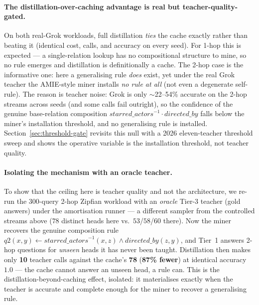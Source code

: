 \documentclass[11pt]{article}
\theoremstyle{plain}
\begin{document}
\paragraph{The distillation-over-caching advantage is real but
teacher-quality-gated.} On both real-Grok workloads, full distillation
\emph{ties} the cache exactly rather than beating it (identical cost, calls, and
accuracy on every seed). For 1-hop this is expected --- a single-relation
lookup has no compositional structure to mine, so no rule emerges and
distillation is definitionally a cache. The 2-hop case is the informative one:
here a generalising rule \emph{does} exist, yet under the real Grok teacher the
AMIE-style miner installs \emph{no rule at all} (not even a degenerate
self-rule). The reason is teacher noise: Grok is only $\sim$22--54\% accurate on
the 2-hop streams across seeds (and some calls fail outright), so the confidence
of the genuine base-relation composition
$\mathit{starred\_actors}^{-1}\cdot\mathit{directed\_by}$ falls below the
miner's installation threshold, and no generalising rule is installed.
Section~\ref{sec:threshold-gate} revisits this null with a 2026 eleven-teacher
threshold sweep and shows the operative variable is the installation threshold,
not teacher quality.

\paragraph{Isolating the mechanism with an oracle teacher.} To show that the
ceiling here is teacher quality and not the architecture, we re-run the
$300$-query 2-hop Zipfian workload with an \emph{oracle} Tier-3 teacher
(gold answers) under the amortisation runner --- a different sampler from
the controlled streams above ($78$ distinct heads here vs.\
$53$/$58$/$60$ there). Now the miner recovers the genuine composition rule
$q2(x,y)\!\leftarrow\!\mathit{starred\_actors}^{-1}(x,z)\wedge\mathit{directed\_by}(z,y)$,
and Tier~1 answers 2-hop questions for \emph{unseen} heads it has never been
taught. Distillation then makes only \textbf{10} teacher calls against the
cache's \textbf{78} (\textbf{87\% fewer}) at identical accuracy $1.0$ --- the
cache cannot answer an unseen head, a rule can. This is the
distillation-beyond-caching effect, isolated: it materialises exactly when the
teacher is accurate and complete enough for the miner to recover a generalising
rule.
\end{document}
